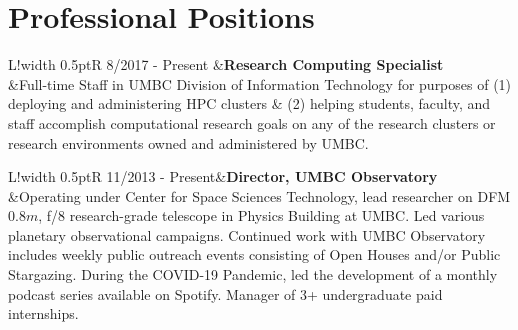 \documentclass[10pt]{article}
\newcommand\VRule{\color{black}\vrule width 0.5pt}
\begin{document}
\section*{Professional Positions}
\vspace{-10pt}
\begin {longtable}{L!{\VRule}R}
8/2017 - Present &{\bf Research Computing Specialist}\\
&{Full-time Staff in UMBC Division of Information Technology for purposes of (1) deploying and administering HPC clusters \& (2) helping students, faculty, and staff accomplish computational research goals on any of the research clusters or research environments owned and administered by UMBC.}\\[5pt]
\end{longtable}

\begin {longtable}{L!{\VRule}R}
11/2013 - Present&{\bf Director, UMBC Observatory}\\
&{Operating under Center for Space Sciences Technology, lead researcher on DFM $0.8m$,  f/8 research-grade telescope in Physics Building at UMBC. Led various planetary observational campaigns. Continued work with UMBC Observatory includes weekly public outreach events consisting of Open Houses and/or Public Stargazing. During the COVID-19 Pandemic, led the development of a monthly podcast series available on Spotify. Manager of 3+ undergraduate paid internships.}\\[5pt]
\end{longtable}
\vspace{-10pt}
\end{document}
